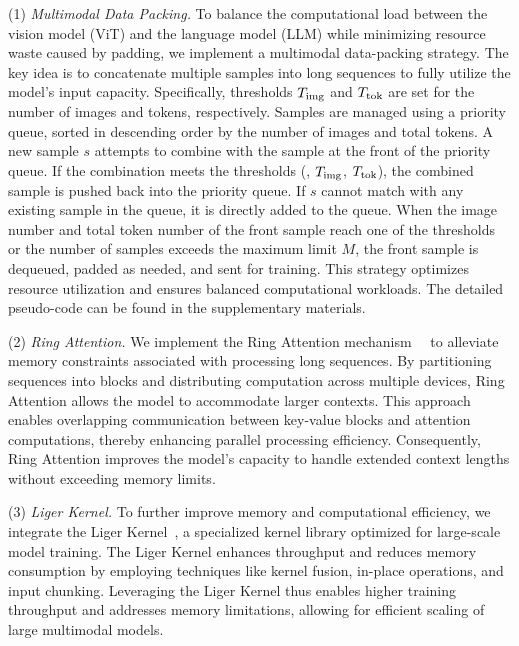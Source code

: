 \documentclass[10pt,twocolumn,letterpaper]{article}
\begin{document}
\begin{CJK}{UTF8}{gbsn}
(1) \emph{Multimodal Data Packing.} To balance the computational load between the vision model (ViT) and the language model (LLM) while minimizing resource waste caused by padding, we implement a multimodal data-packing strategy. The key idea is to concatenate multiple samples into long sequences to fully utilize the model's input capacity. 
Specifically, thresholds $T_{\rm img}$ and $T_{\rm tok}$ are set for the number of images and tokens, respectively. Samples are managed using a priority queue, sorted in descending order by the number of images and total tokens. A new sample \( s \) attempts to combine with the sample at the front of the priority queue. If the combination meets the thresholds (\ie, $T_{\rm img}$, $T_{\rm tok}$), the combined sample is pushed back into the priority queue. If \( s \) cannot match with any existing sample in the queue, it is directly added to the queue. When the image number and total token number of the front sample reach one of the thresholds or the number of samples exceeds the maximum limit \( M \), the front sample is dequeued, padded as needed, and sent for training. This strategy optimizes resource utilization and ensures balanced computational workloads. The detailed pseudo-code can be found in the supplementary materials. 


(2) \emph{Ring Attention.} We implement the Ring Attention mechanism~~\cite{liu2023ring} to alleviate memory constraints associated with processing long sequences. By partitioning sequences into blocks and distributing computation across multiple devices, Ring Attention allows the model to accommodate larger contexts. This approach enables overlapping communication between key-value blocks and attention computations, thereby enhancing parallel processing efficiency. Consequently, Ring Attention improves the model's capacity to handle extended context lengths without exceeding memory limits.

(3) \emph{Liger Kernel.} To further improve memory and computational efficiency, we integrate the Liger Kernel~\cite{dai2024ligerkernel}, a specialized kernel library optimized for large-scale model training. The Liger Kernel enhances throughput and reduces memory consumption by employing techniques like kernel fusion, in-place operations, and input chunking. Leveraging the Liger Kernel thus enables higher training throughput and addresses memory limitations, allowing for efficient scaling of large multimodal models.





\end{CJK}
\end{document}
